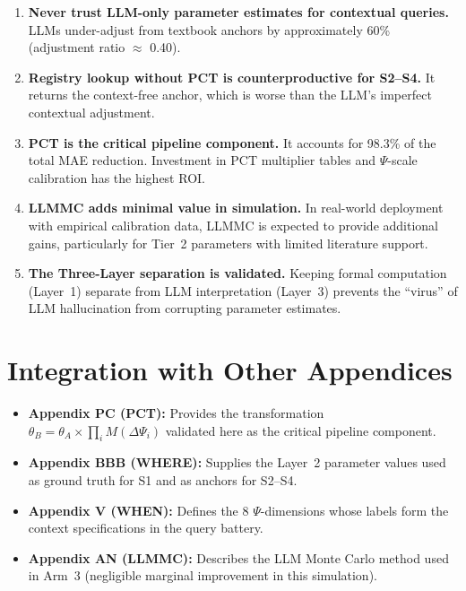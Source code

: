 \begin{enumerate}
\item \textbf{Never trust LLM-only parameter estimates for contextual queries.}
  LLMs under-adjust from textbook anchors by approximately 60\%
  (adjustment ratio $\approx$ 0.40).

\item \textbf{Registry lookup without PCT is counterproductive for S2--S4.}
  It returns the context-free anchor, which is worse than the LLM's
  imperfect contextual adjustment.

\item \textbf{PCT is the critical pipeline component.}
  It accounts for 98.3\% of the total MAE reduction. Investment in
  PCT multiplier tables and $\Psi$-scale calibration has the highest ROI.

\item \textbf{LLMMC adds minimal value in simulation.}
  In real-world deployment with empirical calibration data, LLMMC
  is expected to provide additional gains, particularly for Tier~2
  parameters with limited literature support.

\item \textbf{The Three-Layer separation is validated.}
  Keeping formal computation (Layer~1) separate from LLM interpretation
  (Layer~3) prevents the ``virus'' of LLM hallucination from corrupting
  parameter estimates.
\end{enumerate}



\section{Integration with Other Appendices}
\label{sec:lb-integration}

\begin{itemize}
\item \textbf{Appendix PC (PCT):} Provides the transformation
  $\theta_B = \theta_A \times \prod_i M(\Delta\Psi_i)$ validated here as the
  critical pipeline component.
\item \textbf{Appendix BBB (WHERE):} Supplies the Layer~2 parameter values
  used as ground truth for S1 and as anchors for S2--S4.
\item \textbf{Appendix V (WHEN):} Defines the 8 $\Psi$-dimensions whose
  labels form the context specifications in the query battery.
\item \textbf{Appendix AN (LLMMC):} Describes the LLM Monte Carlo method
  used in Arm~3 (negligible marginal improvement in this simulation).
\end{itemize}


